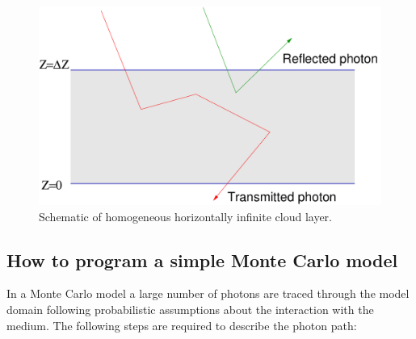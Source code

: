 \documentclass[12pt,twoside,a4paper]{article}
\begin{document}
\begin{figure}[htbp]
  \centering
  \includegraphics[width=0.8\hsize]{./figs/domain_cloudonly.pdf}
  \caption{Schematic of homogeneous horizontally infinite cloud
    layer.}
    \label{fig:cloudonly}
\end{figure}

\subsection{How to program a simple Monte Carlo model} 

In a Monte Carlo model a large number of photons are traced through
the model domain following probabilistic assumptions about the
interaction with the medium. The following steps are required to
describe the photon path:
\end{document}
